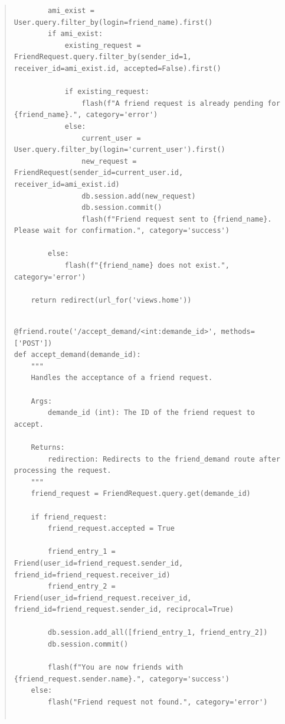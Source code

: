 \documentclass{article}
\begin{document}
\begin{quote}
\begin{tcolorbox}[colback=grisClair,colframe=black]
\begin{lstlisting}
        ami_exist = User.query.filter_by(login=friend_name).first()
        if ami_exist:
            existing_request = FriendRequest.query.filter_by(sender_id=1, receiver_id=ami_exist.id, accepted=False).first()

            if existing_request:
                flash(f"A friend request is already pending for {friend_name}.", category='error')
            else:
                current_user = User.query.filter_by(login='current_user').first()
                new_request = FriendRequest(sender_id=current_user.id, receiver_id=ami_exist.id)
                db.session.add(new_request)
                db.session.commit()
                flash(f"Friend request sent to {friend_name}. Please wait for confirmation.", category='success')

        else:
            flash(f"{friend_name} does not exist.", category='error')

    return redirect(url_for('views.home'))

            \end{lstlisting}       
        \end{tcolorbox}

        \begin{tcolorbox}[colback=grisClair,colframe=black]
            \begin{lstlisting}

@friend.route('/accept_demand/<int:demande_id>', methods=['POST'])
def accept_demand(demande_id):
    """
    Handles the acceptance of a friend request.

    Args:
        demande_id (int): The ID of the friend request to accept.

    Returns:
        redirection: Redirects to the friend_demand route after processing the request.
    """
    friend_request = FriendRequest.query.get(demande_id)

    if friend_request:
        friend_request.accepted = True

        friend_entry_1 = Friend(user_id=friend_request.sender_id, friend_id=friend_request.receiver_id)
        friend_entry_2 = Friend(user_id=friend_request.receiver_id, friend_id=friend_request.sender_id, reciprocal=True)

        db.session.add_all([friend_entry_1, friend_entry_2])
        db.session.commit()

        flash(f"You are now friends with {friend_request.sender.name}.", category='success')
    else:
        flash("Friend request not found.", category='error')


\end{lstlisting}
\end{tcolorbox}
\end{quote}
\end{document}
